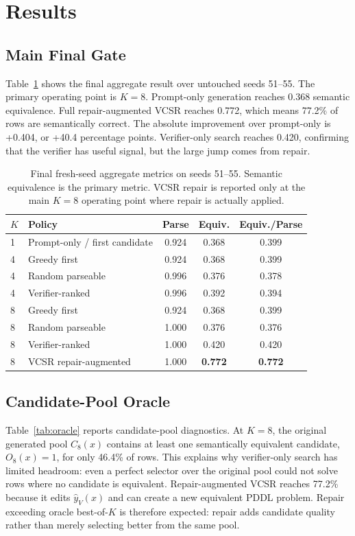 \documentclass[11pt]{article}
\newcommand{\vcsr}{\textsc{VCSR}\xspace}
\newcommand{\pddl}{\textsc{PDDL}\xspace}
\begin{document}
\section{Results}

\subsection{Main Final Gate}

Table~\ref{tab:main} shows the final aggregate result over untouched seeds
51--55. The primary operating point is $K=8$. Prompt-only generation reaches
0.368 semantic equivalence. Full repair-augmented \vcsr reaches 0.772, which
means 77.2\% of rows are semantically correct. The absolute improvement over
prompt-only is +0.404, or +40.4 percentage points. Verifier-only search reaches
0.420, confirming that the verifier has useful signal, but the large jump comes
from repair.

\begin{table}[t]
\centering
\small
\begin{tabular}{llccc}
\toprule
$K$ & Policy & Parse & Equiv. & Equiv./Parse \\
\midrule
1 & Prompt-only / first candidate & 0.924 & 0.368 & 0.399 \\
\midrule
4 & Greedy first & 0.924 & 0.368 & 0.399 \\
4 & Random parseable & 0.996 & 0.376 & 0.378 \\
4 & Verifier-ranked & 0.996 & 0.392 & 0.394 \\
\midrule
8 & Greedy first & 0.924 & 0.368 & 0.399 \\
8 & Random parseable & 1.000 & 0.376 & 0.376 \\
8 & Verifier-ranked & 1.000 & 0.420 & 0.420 \\
8 & \vcsr repair-augmented & 1.000 & \textbf{0.772} & \textbf{0.772} \\
\bottomrule
\end{tabular}
\caption{Final fresh-seed aggregate metrics on seeds 51--55. Semantic
equivalence is the primary metric. \vcsr repair is reported only at the main
$K=8$ operating point where repair is actually applied.}
\label{tab:main}
\end{table}

\subsection{Candidate-Pool Oracle}

Table~\ref{tab:oracle} reports candidate-pool diagnostics. At $K=8$, the
original generated pool \(C_8(x)\) contains at least one semantically
equivalent candidate, \(O_8(x)=1\), for only 46.4\% of rows. This explains why
verifier-only search has limited headroom: even a perfect selector over the
original pool could not solve rows where no candidate is equivalent.
Repair-augmented \vcsr reaches 77.2\% because it edits \(\hat{y}_V(x)\) and can
create a new equivalent \pddl problem. Repair exceeding oracle best-of-$K$ is
therefore expected: repair adds candidate quality rather than merely selecting
better from the same pool.
\end{document}
